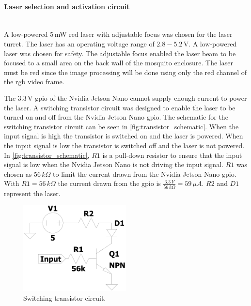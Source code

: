 \paragraph{Laser selection and activation circuit}\hfill\\
A low-powered 5\,mW red laser with adjustable focus was chosen for the laser turret. The laser has an operating voltage range of $2.8 - 5.2$\,V. A low-powered laser was chosen for safety. The adjustable focus enabled the laser beam to be focused to a small area on the back wall of the mosquito enclosure. The laser must be red since the image processing will be done using only the red channel of the \gls{rgb} video frame.

The 3.3\,V \gls{gpio} of the Nvidia Jetson Nano cannot supply enough current to power the laser. A switching transistor circuit was designed to enable the laser to be turned on and off from the Nvidia Jetson Nano \gls{gpio}. The schematic for the switching transistor circuit can be seen in \autoref{fig:transistor_schematic}.  When the input signal is high the transistor is switched on and the laser is powered. When the input signal is low the transistor is switched off and the laser is not powered. In \autoref{fig:transistor_schematic}, $R1$ is a pull-down resistor to ensure that the input signal is low when the Nvidia Jetson Nano is not driving the input signal. $R1$ was chosen as $56\,k\Omega$ to limit the current drawn from the Nvidia Jetson Nano \gls{gpio}. With $R1 = 56\,k\Omega$ the current drawn from the \gls{gpio} is $\frac{3.3\,V}{56\,k\Omega} = 59\,\mu A$. $R2$ and $D1$ represent the laser.
\begin{figure}[h]
  \centering
  \includegraphics[width=0.5\textwidth]{figures/hardware_design/laser_transistor_schematic.pdf}
  \caption{Switching transistor circuit.}
  \label{fig:transistor_schematic}
\end{figure}


